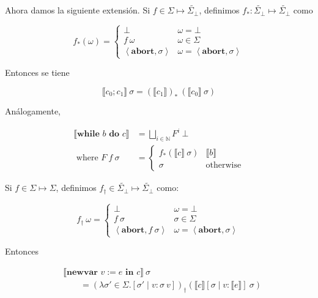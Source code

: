\documentclass[a4paper, 12pt]{article}
\begin{document}
Ahora damos la siguiente extensión. Si $f \in \Sigma \mapsto \widetilde{
\Sigma_\bot  } $, definimos $f_* :
\widetilde{ \Sigma_\bot  } \mapsto \widetilde{ \Sigma_\bot  }$ como

\begin{equation*}
  f_*(\omega) = \begin{cases}
    \bot  & \omega = \bot  \\ 
    f ~ \omega & \omega \in \Sigma \\ 
    \left<\textbf{abort}, \sigma \right> & \omega = \left<\textbf{abort}, \sigma \right>
  \end{cases}
\end{equation*}

Entonces se tiene

\begin{equation*}
  \llbracket c_0;c_1 \rrbracket ~ \sigma = \left( \llbracket c_1 \rrbracket
  \right)_{*} ~ \left( \llbracket c_0 \rrbracket ~ \sigma\right) 
\end{equation*}

Análogamente,

\begin{align*}
  \llbracket \textbf{while } b \textbf{ do } c \rrbracket &= \bigsqcup_{i \in
  \mathbb{N}} F^i ~ \bot  \\ 
    \text{ where } F ~ f ~ \sigma &= \begin{cases}
    f_{*}(\llbracket c \rrbracket ~ \sigma) & \llbracket b \rrbracket \\ 
    \sigma & \text{otherwise}
  \end{cases}
\end{align*}


Si $f \in \Sigma \mapsto \Sigma$, definimos $f_\dagger \in \widetilde{
\Sigma_\bot  } \mapsto \widetilde{ \Sigma_\bot  } $ como:

\begin{equation*}
  f_\dagger ~ \omega = \begin{cases}
    \bot  & \omega = \bot  \\ 
    f ~ \sigma & \sigma \in \Sigma \\ 
    \left<\textbf{abort}, f ~ \sigma \right> & \omega = \left<\textbf{abort}, \sigma \right>
  \end{cases}
\end{equation*}

Entonces

\begin{align*}
  &\llbracket \textbf{newvar } v := e \textbf{ in } c\rrbracket ~ \sigma \\ 
  &\qquad = \left( \lambda \sigma' \in \Sigma . [\sigma' \mid v : \sigma ~ v]
  \right)_{\dagger} \left( \llbracket c \rrbracket [\sigma \mid v : \llbracket e
  \rrbracket] ~ \sigma \right) 
\end{align*}
\end{document}
